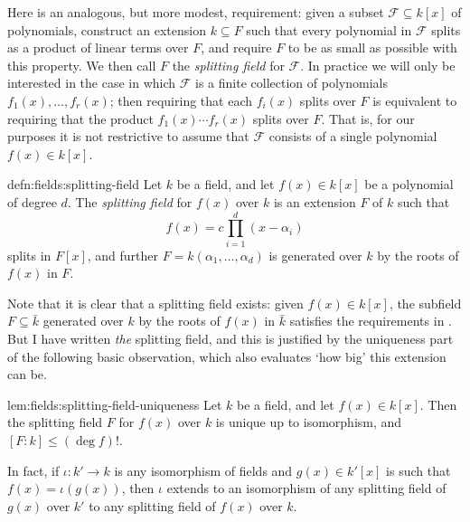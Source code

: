 Here is an analogous, but more modest, requirement: given a subset
$\mathcal{F} \subseteq k[x]$ of polynomials, construct an extension
$k \subseteq F$ such that every polynomial in $\mathcal{F}$ splits as
a product of linear terms over $F$, and require $F$ to be as small as
possible with this property. We then call $F$ the \emph{splitting
  field} for $\mathcal{F}$. In practice we will only be interested in
the case in which $\mathcal{F}$ is a finite collection of polynomials
$f_1(x), \dots, f_r(x)$; then requiring that each $f_i(x)$ splits over
$F$ is equivalent to requiring that the product $f_1(x) \cdots f_r(x)$
splits over $F$. That is, for our purposes it is not restrictive to
assume that $\mathcal{F}$ consists of a single polynomial
$f(x) \in k[x]$.
\begin{defn}{}{defn:fields:splitting-field}
  Let $k$ be a field, and let $f(x) \in k[x]$ be a polynomial of
  degree $d$. The \emph{splitting field} for $f(x)$ over $k$ is an
  extension $F$ of $k$ such that
  \[
    f(x) = c \prod_{i=1}^d (x - \alpha_i)
  \]
  splits in $F[x]$, and further $F = k(\alpha_1, \dots, \alpha_d)$ is
  generated over $k$ by the roots of $f(x)$ in $F$.
\end{defn}
Note that it is clear that a splitting field exists: given
$f(x) \in k[x]$, the subfield $F \subseteq \bar{k}$ generated over $k$
by the roots of $f(x)$ in $\bar{k}$ satisfies the requirements in
.  But I have written \emph{the} splitting
field, and this is justified by the uniqueness part of the following
basic observation, which also evaluates `how big' this extension can
be.
\begin{lem}{}{lem:fields:splitting-field-uniqueness}
  Let $k$ be a field, and let $f(x) \in k[x]$. Then the splitting
  field $F$ for $f(x)$ over $k$ is unique up to isomorphism, and
  $[F:k] \leq (\deg f)!$.

  In fact, if $\iota : k' \to k$ is any isomorphism of fields and
  $g(x) \in k'[x]$ is such that $f(x) = \iota(g(x))$, then $\iota$
  extends to an isomorphism of any splitting field of $g(x)$ over $k'$
  to any splitting field of $f(x)$ over $k$.
\end{lem}
